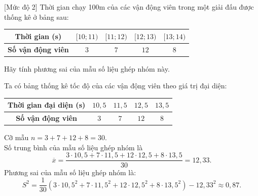 \begin{bt}%
[Mức độ 2]%
Thời gian chạy 100m của các vận động viên trong một giải đấu được thống kê ở bảng sau:
\begin{center}
\begin{tabular}{|c|c|c|c|c|}
\hline
\textbf{Thời gian (s)} & $[10; 11)$ & $[11; 12)$ & $[12; 13)$ & $[13; 14)$ \\
\hline
\textbf{Số vận động viên} & $3$ & $7$ & $12$ & $8$ \\
\hline
\end{tabular}
\end{center}
Hãy tính phương sai của mẫu số liệu ghép nhóm này.
\loigiai
{
Ta có bảng thống kê tốc độ của các vận động viên theo giá trị đại diện:
\begin{center}
\begin{tabular}{|c|c|c|c|c|}
\hline
\textbf{Thời gian đại diện (s)} & $10{,}5$ & $11{,}5$ & $12{,}5$ & $13{,}5$ \\
\hline
\textbf{Số vận động viên} & $3$ & $7$ & $12$ & $8$ \\
\hline
\end{tabular}
\end{center}
Cỡ mẫu $n=3+7+12+8=30$.\\
Số trung bình của mẫu số liệu ghép nhóm là
\[ \overline{x}=\dfrac{3\cdot 10{,}5+7\cdot 11{,}5+12\cdot 12{,}5+8\cdot 13{,}5}{30}=12{,}33. \]
Phương sai của mẫu số liệu ghép nhóm là:
\[ S^2=\dfrac{1}{30}\left(3\cdot 10{,}5^2+7\cdot 11{,}5^2+12\cdot 12{,}5^2+8\cdot 13{,}5^2 \right)-12{,}33^2\approx 0{,}87. \]
}
\end{bt}

